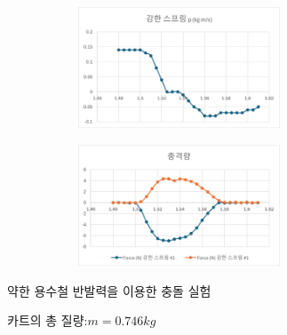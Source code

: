 \documentclass[12pt,a4paper]{article}
\begin{document}
\begin{figure}[h!]
    \centering
    \begin{subfigure}{0.4\textwidth}
        \includegraphics[width=6cm]{W11G8.png}
    \end{subfigure}
    \begin{subfigure}{0.4\textwidth}
        \includegraphics[width=6cm]{W11G9.png}
    \end{subfigure}
\end{figure}
약한 용수철 반발력을 이용한 충돌 실험

카트의 총 질량:$m=0.746kg$
\end{document}
